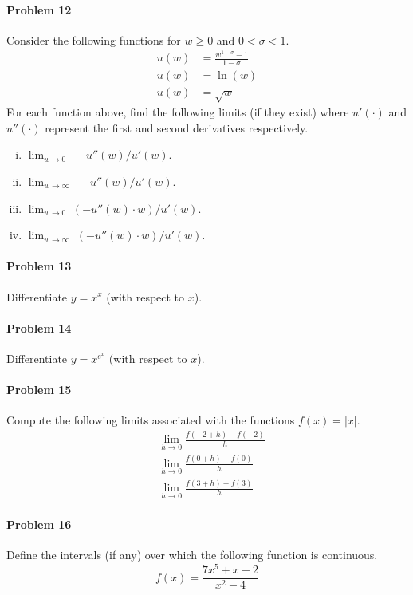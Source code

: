 \documentclass[a4paper, 11pt]{article}
\begin{document}
\paragraph{Problem 12}
Consider the following functions for $w \geq 0$ and $0 < \sigma < 1$.
\begin{align}
    u(w) &= \frac{w^{1-\sigma}-1}{1-\sigma}  \nonumber \\
    u(w) &= \ln(w) \nonumber \nonumber \\
    u(w) &= \sqrt{w} \nonumber 
\end{align}
For each function above, find the following limits (if they exist) where $u'(\cdot)$ and $u''(\cdot)$ represent the first and second derivatives respectively.
\begin{enumerate}[(i)]
	\item $\lim_{w\rightarrow 0} \; -u''(w)/u'(w)$.
	\item $\lim_{w\rightarrow \infty} \; -u''(w)/u'(w)$.
	\item $\lim_{w\rightarrow 0} \; (-u''(w)\cdot w)/u'(w)$.
	\item $\lim_{w\rightarrow \infty} \; (-u''(w)\cdot w)/u'(w)$.
\end{enumerate}

\paragraph{Problem 13} Differentiate $y = x^x$ (with respect to $x$).


\paragraph{Problem 14} Differentiate $y = x^{e^x}$ (with respect to $x$).


\paragraph{Problem 15} Compute the following limits associated with the functions $f(x) = |x|$.
\begin{align}
    &\lim_{h\rightarrow 0} \frac{f(-2 + h) - f(-2)}{h}  \nonumber \\
    &\lim_{h\rightarrow 0} \frac{f(0 + h) - f(0)}{h} \nonumber \\
    &\lim_{h\rightarrow 0} \frac{f(3 + h) + f(3)}{h} \nonumber
\end{align}

\paragraph{Problem 16}
Define the intervals (if any) over which the following function is continuous.
\[
	f(x) = \frac{7x^5 + x - 2}{x^2-4}
\]
\end{document}
